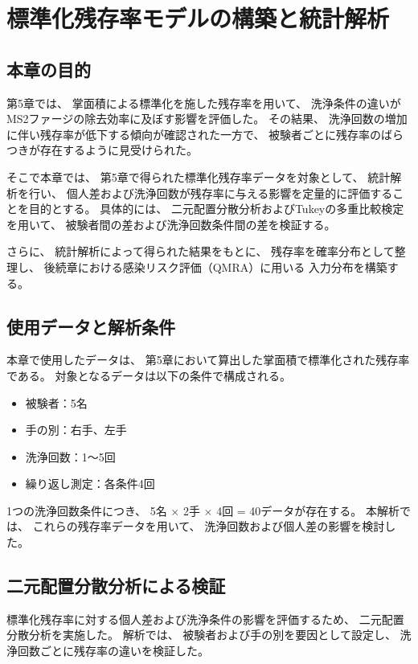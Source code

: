 
\chapter{標準化残存率モデルの構築と統計解析}

\section{本章の目的}

第5章では、
掌面積による標準化を施した残存率を用いて、
洗浄条件の違いがMS2ファージの除去効率に及ぼす影響を評価した。
その結果、
洗浄回数の増加に伴い残存率が低下する傾向が確認された一方で、
被験者ごとに残存率のばらつきが存在するように見受けられた。

そこで本章では、
第5章で得られた標準化残存率データを対象として、
統計解析を行い、
個人差および洗浄回数が残存率に与える影響を定量的に評価することを目的とする。
具体的には、
二元配置分散分析およびTukeyの多重比較検定を用いて、
被験者間の差および洗浄回数条件間の差を検証する。

さらに、
統計解析によって得られた結果をもとに、
残存率を確率分布として整理し、
後続章における感染リスク評価（QMRA）に用いる
入力分布を構築する。
\section{使用データと解析条件}

本章で使用したデータは、
第5章において算出した掌面積で標準化された残存率である。
対象となるデータは以下の条件で構成される。

\begin{itemize}
  \item 被験者：5名
  \item 手の別：右手、左手
  \item 洗浄回数：1～5回
  \item 繰り返し測定：各条件4回
\end{itemize}

1つの洗浄回数条件につき、
5名 $\times$ 2手 $\times$ 4回 = 40データが存在する。
本解析では、
これらの残存率データを用いて、
洗浄回数および個人差の影響を検討した。
\section{二元配置分散分析による検証}

標準化残存率に対する個人差および洗浄条件の影響を評価するため、
二元配置分散分析を実施した。
解析では、
被験者および手の別を要因として設定し、
洗浄回数ごとに残存率の違いを検証した。

